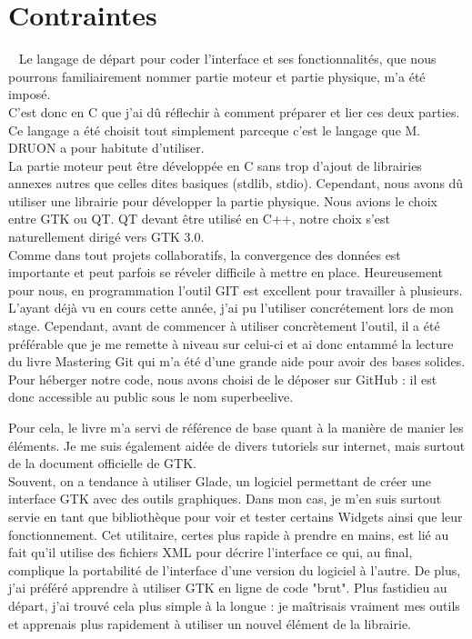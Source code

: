 \documentclass[11pt,french,a4paper]{report}
\begin{document}
    \section{Contraintes} 
Le langage de départ pour coder l'interface et ses fonctionnalités, que nous pourrons familiairement nommer partie moteur et partie physique, m'a été imposé. \\
C'est donc en C que j'ai dû réflechir à comment préparer et lier ces deux parties. Ce langage a été choisit tout simplement parceque c'est 
le langage que M. DRUON a pour habitute d'utiliser. \\
La partie moteur peut être développée en C sans trop d'ajout de librairies annexes autres que celles dites basiques (stdlib, stdio). Cependant, 
nous avons dû utiliser une librairie pour développer la partie physique. Nous avions le choix entre GTK ou QT. QT devant être utilisé en C++, 
notre choix s'est naturellement dirigé vers GTK 3.0. \\
Comme dans tout projets collaboratifs, la convergence des données est importante et peut parfois se réveler difficile à mettre en place. 
Heureusement pour nous, en programmation l'outil GIT est excellent pour travailler à plusieurs. L'ayant déjà vu en cours cette année, j'ai pu l'utiliser 
concrétement lors de mon stage. Cependant, avant de commencer à utiliser concrètement l'outil, il a été préférable que je me remette à niveau sur celui-ci
et ai donc entammé la lecture du livre Mastering Git %
qui m'a été d'une grande aide pour avoir des bases solides. Pour héberger notre code, nous avons choisi de le déposer sur GitHub : il est donc accessible au 
public sous le nom superbeelive. 

Pour cela, le livre %
m'a servi de référence de base quant à la manière de manier les éléments. Je me suis également aidée de divers tutoriels sur internet, mais surtout 
de la document officielle de GTK. %
\\
Souvent, on a tendance à utiliser Glade, un logiciel permettant de créer une interface GTK avec des outils graphiques. Dans mon cas, je m'en suis surtout servie 
en tant que bibliothèque pour voir et tester certains Widgets ainsi que leur fonctionnement. Cet utilitaire, certes plus rapide à prendre en mains, est lié 
au fait qu'il utilise des fichiers XML pour décrire l'interface ce qui, au final, complique la portabilité de l'interface d'une version du logiciel à l'autre. 
De plus, j'ai préféré apprendre à utiliser GTK en ligne de code "brut". Plus fastidieu au départ, j'ai trouvé cela plus simple à la longue : je maîtrisais vraiment 
mes outils et apprenais plus rapidement à utiliser un nouvel élément de la librairie.  
\end{document}
